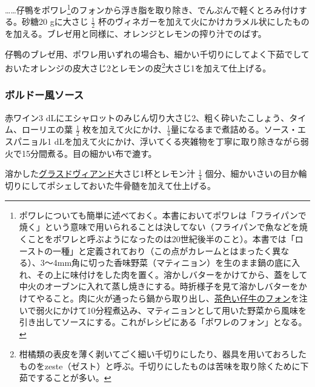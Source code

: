 \begin{recette}
\ldots{}\ldots{}仔鴨をポワレ\footnote{ポワレについても簡単に述べておく。本書においてポワレは「フライパンで焼く」という意味で用いられることは決してない（フライパンで魚などを焼くことをポワレと呼ぶようになったのは20世紀後半のこと）。本書では「ローストの一種」と定義されており（この点がカレームとはまったく異なる）、3〜4mm角に切った香味野菜（マティニョン）を生のまま鍋の底に入れ、その上に味付けをした肉を置く。溶かしバターをかけてから、蓋をして中火のオーブンに入れて蒸し焼きにする。時折様子を見て溶かしバターをかけてやること。肉に火が通ったら鍋から取り出し、\protect\hyperlink{jus-de-veau-brun}{茶色い仔牛のフォン}を注いで弱火にかけて10分程煮込み、マティニョンとして用いた野菜から風味を引き出してソースにする。これがレシピにある「ポワレのフォン」となる。}のフォンから浮き脂を取り除き、でんぷんで軽くとろみ付けする。砂糖20
gに大さじ \(\frac{1}{2}\)
杯のヴィネガーを加えて火にかけカラメル状にしたものを加える。ブレゼ用と同様に、オレンジとレモンの搾り汁でのばす。

仔鴨のブレゼ用、ポワレ用いずれの場合も、細かい千切りにしてよく下茹でしておいたオレンジの皮大さじ2とレモンの皮\footnote{柑橘類の表皮を薄く剥いてごく細い千切りにしたり、器具を用いておろしたものをzeste（ゼスト）と呼ぶ。千切りにしたものは苦味を取り除くために下茹ですることが多い。}大さじ1を加えて仕上げる。

\atoaki{}

\hypertarget{sauce-bordelaise}{%
\subsubsection{ボルドー風ソース}\label{sauce-bordelaise}}


 

赤ワイン3
dLにエシャロットのみじん切り大さじ2、粗く砕いたこしょう、タイム、ローリエの葉
\(\frac{1}{2}\)
枚を加えて火にかけ、\(\frac{1}{4}\)量になるまで煮詰める。ソース・エスパニョル1
dLを加えて火にかけ、浮いてくる夾雑物を丁寧に取り除きながら弱火で15分間煮る。目の細かい布で漉す。

溶かした\protect\hyperlink{glace-de-viande}{グラスドヴィアンド}大さじ1杯とレモン汁
\(\frac{1}{4}\)
個分、細かいさいの目か輪切りにしてポシェしておいた牛骨髄を加えて仕上げる。


\end{recette}
